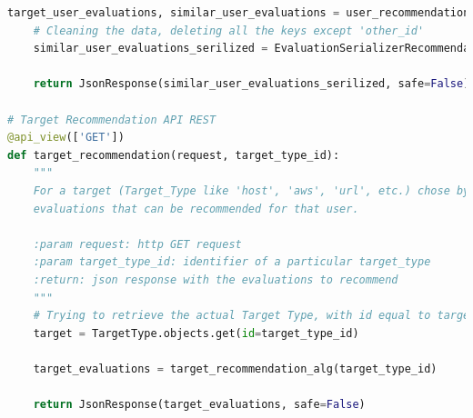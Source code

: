 \begin{lstlisting}[language=Python, label=lst:view_rec, caption={Porzione parziale del codice contenuto nelle View per implementare
    i sistemi di raccomandazione.}]
    target_user_evaluations, similar_user_evaluations = user_recommendation_alg(user_other_id)
    # Cleaning the data, deleting all the keys except 'other_id'
    similar_user_evaluations_serilized = EvaluationSerializerRecommendation(similar_user_evaluations, many=True).data
 
    return JsonResponse(similar_user_evaluations_serilized, safe=False)
 
# Target Recommendation API REST
@api_view(['GET'])
def target_recommendation(request, target_type_id):
    """
    For a target (Target_Type like 'host', 'aws', 'url', etc.) chose by a user this algorithm search the possible
    evaluations that can be recommended for that user.
 
    :param request: http GET request
    :param target_type_id: identifier of a particular target_type
    :return: json response with the evaluations to recommend
    """
    # Trying to retrieve the actual Target Type, with id equal to target_type_id, chosed by a user
    target = TargetType.objects.get(id=target_type_id)
 
    target_evaluations = target_recommendation_alg(target_type_id)
 
    return JsonResponse(target_evaluations, safe=False)
\end{lstlisting}
\lstset{style=python_code_style}
